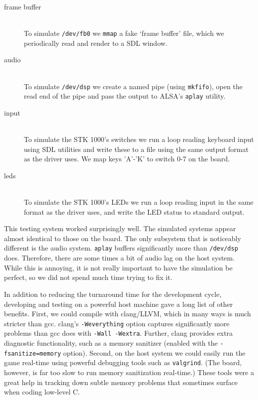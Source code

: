 \documentclass[a4paper,10pt]{article}
\newcommand{\isrc}[1]{\texttt{#1}}
\begin{document}
\begin{description}
    \item[frame buffer] \hfill \\
        To simulate \texttt{/dev/fb0} we \isrc{mmap} a fake `frame buffer'
        file, which we periodically read and render to a SDL window.

    \item[audio] \hfill \\
        To simulate \texttt{/dev/dsp} we create a named pipe (using
        \isrc{mkfifo}), open the read end of the pipe and pass the output to
        ALSA's \isrc{aplay} utility.

    \item[input] \hfill \\
        To simulate the STK 1000's switches we run a loop reading keyboard
        input using SDL utilities and write these to a file using the same
        output format as the driver uses. We map keys
        'A'-'K' to switch 0-7 on the board.

    \item[leds] \hfill \\
        To simulate the STK 1000's LEDs we run a loop reading input in the
        same format as the driver uses, and write the LED status to standard
        output.
\end{description}
This testing system worked surprisingly well. The simulated systems appear
almost identical to those on the board. The only subsystem that is noticeably
different is the audio system. \isrc{aplay} buffers significantly more than
\isrc{/dev/dsp} does. Therefore, there are some times a bit of audio lag on
the host system. While this is annoying, it is not really important to have
the simulation be perfect, so we did not spend much time trying to fix it.

In addition to reducing the turnaround time for the development cycle,
developing and testing on a powerful host machine gave a long list of
other benefits.  First, we could compile with clang/LLVM, which in many ways
is much stricter than gcc.  clang's \texttt{-Weverything} option captures
significantly more problems than gcc does with \texttt{-Wall -Wextra}.
Further, clang provides extra diagnostic functionality, such as a memory
sanitizer (enabled with the \texttt{-fsanitize=memory} option). Second, on the
host system we could easily run the game real-time using powerful debugging
tools such as \texttt{valgrind}. (The board, however, is far too slow to run memory
sanitization real-time.) These tools were a great help in tracking down subtle
memory problems that sometimes surface when coding low-level C.
\end{document}
